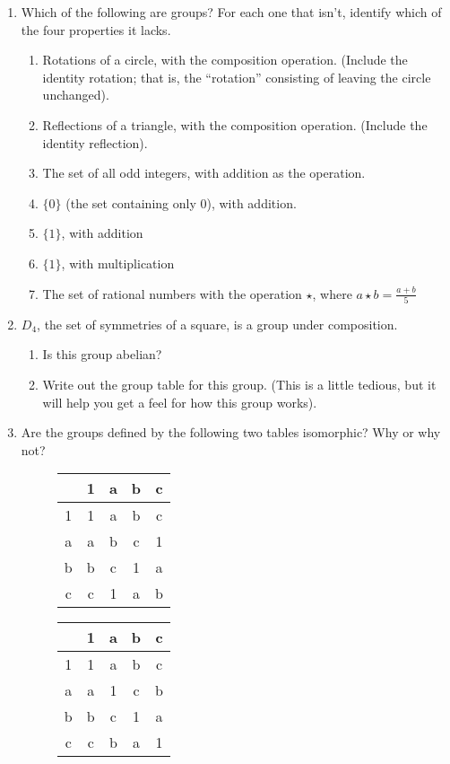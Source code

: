 \documentclass[10pt, letterpaper]{article}
\begin{document}
\begin{enumerate}

\item Which of the following are groups? For each one that isn't,
  identify which of the four properties it lacks.

\begin{enumerate}

\item Rotations of a circle, with the composition operation. (Include
  the identity rotation; that is, the ``rotation'' consisting of
  leaving the circle unchanged).

\item Reflections of a triangle, with the composition
  operation. (Include the identity reflection). 

\item The set of all odd integers, with addition as the operation.

\item $\{0\}$ (the set containing only $0$), with addition.

\item $\{1\}$, with addition

\item $\{1\}$, with multiplication

\item The set of rational numbers with the operation $\star$, where
  $a \star b = \frac{a + b}{5}$
\end{enumerate}

\item $D_4$, the set of symmetries of a square, is a group under
  composition.
  \begin{enumerate}
    \item Is this group abelian?

    \item Write out the group table for this group. (This is a little
      tedious, but it will help you get a feel for how this group
      works).
  \end{enumerate}

\item Are the groups defined by the following two tables isomorphic?
  Why or why not?

\begin{figure}[h]
\centering
\begin{tabular} { c|cccc }
   & 1 & a & b & c \\ \hline
 1 & 1 & a & b & c \\
 a & a & b & c & 1 \\
 b & b & c & 1 & a \\
 c & c & 1 & a & b
\end{tabular}
\qquad
\begin{tabular}{c|cccc}
  & 1 & a & b & c \\ \hline
1 & 1 & a & b & c \\
a & a & 1 & c & b \\
b & b & c & 1 & a \\
c & c & b & a & 1
\end{tabular}
\end{figure}


\end{enumerate}
\end{document}
